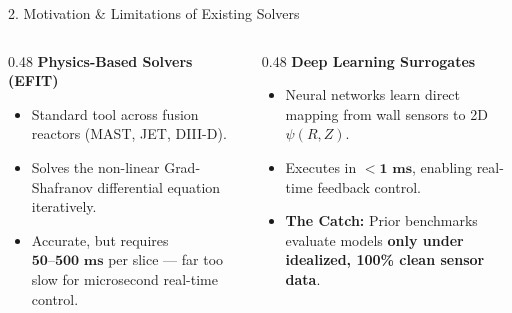 \documentclass[aspectratio=169, 10pt]{beamer}
\begin{document}
\begin{frame}{2. Motivation \& Limitations of Existing Solvers}
  \begin{columns}[T]
    \begin{column}{0.48\textwidth}
      \textbf{\color{NavyBlue} Physics-Based Solvers (EFIT)}
      \begin{itemize}
        \item Standard tool across fusion reactors (MAST, JET, DIII-D).
        \item Solves the non-linear Grad-Shafranov differential equation iteratively.
        \item Accurate, but requires $\mathbf{50\text{--}500\text{ ms}}$ per slice --- far too slow for microsecond real-time control.
      \end{itemize}
    \end{column}

    \begin{column}{0.48\textwidth}
      \textbf{\color{NavyBlue} Deep Learning Surrogates}
      \begin{itemize}
        \item Neural networks learn direct mapping from wall sensors to 2D $\psi(R, Z)$.
        \item Executes in $<\!\mathbf{1\text{ ms}}$, enabling real-time feedback control.
        \item \textbf{The Catch:} Prior benchmarks evaluate models \textbf{only under idealized, 100\% clean sensor data}.
      \end{itemize}
    \end{column}
  \end{columns}
\end{frame}
\end{document}
